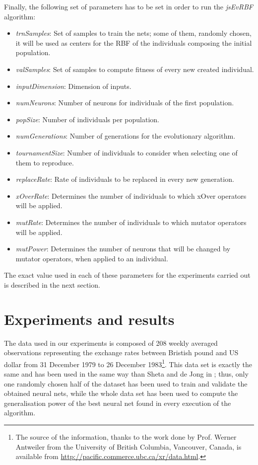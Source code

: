 \documentclass{article}
\begin{document}
Finally, the following set of parameters has to be set in
order to run the {\em jsEvRBF} algorithm: %
\begin{itemize}
\item{\em trnSamples}: Set of samples to train the nets; some of them, randomly chosen, it will be used as centers for the RBF of the individuals composing the initial population.
\item{\em valSamples}: Set of samples to compute fitness of every new created individual.
\item{\em inputDimension}: Dimension of inputs.
\item{\em numNeurons}: Number of neurons for individuals of the first population.
\item{\em popSize}: Number of individuals per population.
\item{\em numGenerations}: Number of generations for the evolutionary algorithm.
\item{\em tournamentSize}: Number of individuals to consider when selecting one of them to reproduce.
\item{\em replaceRate}: Rate of individuals to be replaced in every new generation.
\item{\em xOverRate}: Determines the number of individuals to which xOver operators will be applied.
\item{\em mutRate}: Determines the number of individuals to which mutator operators will be applied.
\item{\em mutPower}: Determines the number of neurons that will be changed by mutator operators, when applied to an individual.
\end{itemize}

The exact value used in each of these parameters for the experiments carried out is described in the next section.
\section{Experiments and results}
\label{sec:experiments}
The data used in our experiments is composed of 208
weekly averaged observations representing the exchange rates between
Bristish pound and US dollar from 31 December 1979 to 26 December
1983\footnote{The source of the information, thanks to the work done
  by Prof. Werner Antweiler from the University of British Columbia,
  Vancouver, Canada, is available from
  \url{http://pacific.commerce.ubc.ca/xr/data.html}.}. This data set is exactly the same and
has been used in the same way than Sheta and de Jong in
\cite{Sheta2001}; thus, only one randomly chosen half of the
dataset has been used to train and validate the obtained neural nets,
while the whole data set has been used to compute the generalisation
power of the best neural net found in every execution of the
algorithm.
\end{document}
